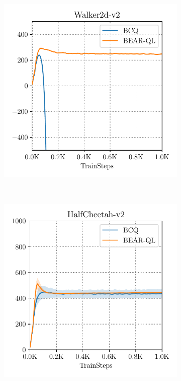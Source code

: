 \begin{figure}[h]
\begin{subfigure}[h]{0.31\textwidth}
        \includegraphics[width=0.99\linewidth]{chapters/bear/images/walker_mediocre_q_val.pdf}
    \end{subfigure}%
    ~
    \begin{subfigure}[h]{0.31\textwidth}
        \centering
        \includegraphics[width=0.99\linewidth]{chapters/bear/images/cheetah_mediocre_qval.pdf}

\end{subfigure}
\end{figure}

